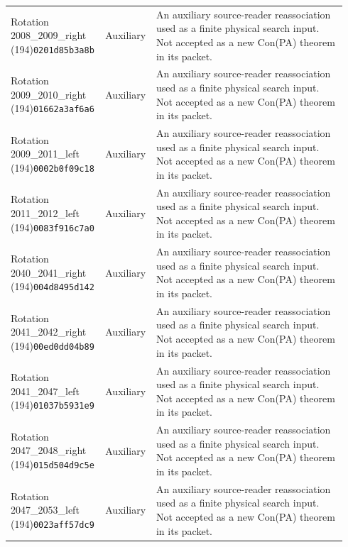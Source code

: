 \begin{longtable}{@{}p{0.24\linewidth}p{0.14\linewidth}p{0.56\linewidth}@{}}
Rotation 2008\_2009\_right (194)\newline\texttt{0201d85b3a8b} & Auxiliary & An auxiliary source-reader reassociation used as a finite physical search input. Not accepted as a new Con(PA) theorem in its packet.\\[4pt]
Rotation 2009\_2010\_right (194)\newline\texttt{01662a3af6a6} & Auxiliary & An auxiliary source-reader reassociation used as a finite physical search input. Not accepted as a new Con(PA) theorem in its packet.\\[4pt]
Rotation 2009\_2011\_left (194)\newline\texttt{0002b0f09c18} & Auxiliary & An auxiliary source-reader reassociation used as a finite physical search input. Not accepted as a new Con(PA) theorem in its packet.\\[4pt]
Rotation 2011\_2012\_left (194)\newline\texttt{0083f916c7a0} & Auxiliary & An auxiliary source-reader reassociation used as a finite physical search input. Not accepted as a new Con(PA) theorem in its packet.\\[4pt]
Rotation 2040\_2041\_right (194)\newline\texttt{004d8495d142} & Auxiliary & An auxiliary source-reader reassociation used as a finite physical search input. Not accepted as a new Con(PA) theorem in its packet.\\[4pt]
Rotation 2041\_2042\_right (194)\newline\texttt{00ed0dd04b89} & Auxiliary & An auxiliary source-reader reassociation used as a finite physical search input. Not accepted as a new Con(PA) theorem in its packet.\\[4pt]
Rotation 2041\_2047\_left (194)\newline\texttt{01037b5931e9} & Auxiliary & An auxiliary source-reader reassociation used as a finite physical search input. Not accepted as a new Con(PA) theorem in its packet.\\[4pt]
Rotation 2047\_2048\_right (194)\newline\texttt{015d504d9c5e} & Auxiliary & An auxiliary source-reader reassociation used as a finite physical search input. Not accepted as a new Con(PA) theorem in its packet.\\[4pt]
Rotation 2047\_2053\_left (194)\newline\texttt{0023aff57dc9} & Auxiliary & An auxiliary source-reader reassociation used as a finite physical search input. Not accepted as a new Con(PA) theorem in its packet.\\[4pt]

\end{longtable}
